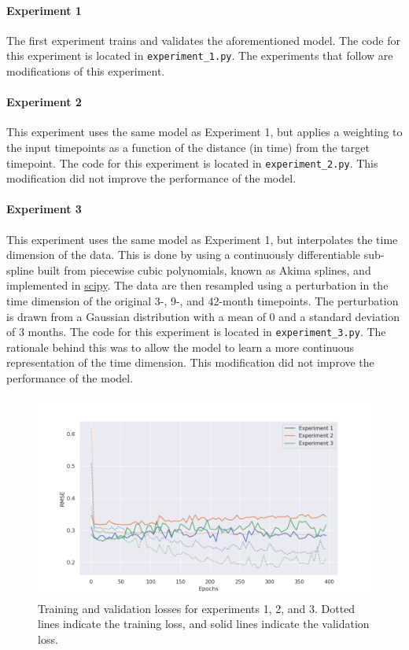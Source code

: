 \documentclass[twocolumn, 9pt]{extarticle}
\begin{document}
\paragraph{Experiment 1} The first experiment trains and validates the aforementioned model. The code for this experiment is located in \texttt{experiment\_1.py}. The experiments that follow are modifications of this experiment.

\paragraph{Experiment 2} This experiment uses the same model as Experiment 1, but applies a weighting to the input timepoints as a function of the distance (in time) from the target timepoint. The code for this experiment is located in \texttt{experiment\_2.py}. This modification did not improve the performance of the model.

\paragraph{Experiment 3} This experiment uses the same model as Experiment 1, but interpolates the time dimension of the data. This is done by using a continuously differentiable sub-spline built from piecewise cubic polynomials, known as Akima splines, and implemented in \href{https://docs.scipy.org/doc/scipy/reference/generated/scipy.interpolate.Akima1DInterpolator.html\#scipy.interpolate.Akima1DInterpolator}{scipy}. The data are then resampled using a perturbation in the time dimension of the original 3-, 9-, and 42-month timepoints. The perturbation is drawn from a Gaussian distribution with a mean of 0 and a standard deviation of 3 months. The code for this experiment is located in \texttt{experiment\_3.py}. The rationale behind this was to allow the model to learn a more continuous representation of the time dimension. This modification did not improve the performance of the model.

\begin{figure}
  \centering
  \includegraphics[width=\columnwidth]{cnn_autoencoder_experiments_1_to_3.png}
  \caption{Training and validation losses for experiments 1, 2, and 3. Dotted lines indicate the training loss, and solid lines indicate the validation loss.}
  \label{fig:losses_cnn}
\end{figure}
\end{document}
